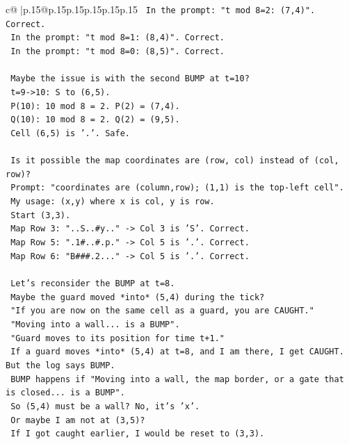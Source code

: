 \documentclass{article}
\begin{document}
{\begin{supertabular}{c@{$\;$}|p{.15\linewidth}@{}p{.15\linewidth}p{.15\linewidth}p{.15\linewidth}p{.15\linewidth}p{.15\linewidth}}
{{{\texttt{  In the prompt: "t mod 8=2: (7,4)". Correct.} \\
\texttt{  In the prompt: "t mod 8=1: (8,4)". Correct.} \\
\texttt{  In the prompt: "t mod 8=0: (8,5)". Correct.} \\
\\ 
\texttt{  Maybe the issue is with the second BUMP at t=10?} \\
\texttt{  t=9{-}>10: S to (6,5).} \\
\texttt{  P(10): 10 mod 8 = 2. P(2) = (7,4).} \\
\texttt{  Q(10): 10 mod 8 = 2. Q(2) = (9,5).} \\
\texttt{  Cell (6,5) is '.'. Safe.} \\
\\ 
\texttt{  Is it possible the map coordinates are (row, col) instead of (col, row)?} \\
\texttt{  Prompt: "coordinates are (column,row); (1,1) is the top{-}left cell".} \\
\texttt{  My usage: (x,y) where x is col, y is row.} \\
\texttt{  Start (3,3).} \\
\texttt{  Map Row 3: "..S..\#y.." {-}> Col 3 is 'S'. Correct.} \\
\texttt{  Map Row 5: ".1\#..\#.p." {-}> Col 5 is '.'. Correct.} \\
\texttt{  Map Row 6: "B\#\#\#.2..." {-}> Col 5 is '.'. Correct.} \\
\\ 
\texttt{  Let's reconsider the BUMP at t=8.} \\
\texttt{  Maybe the guard moved *into* (5,4) during the tick?} \\
\texttt{  "If you are now on the same cell as a guard, you are CAUGHT."} \\
\texttt{  "Moving into a wall... is a BUMP".} \\
\texttt{  "Guard moves to its position for time t+1."} \\
\texttt{  If a guard moves *into* (5,4) at t=8, and I am there, I get CAUGHT. But the log says BUMP.} \\
\texttt{  BUMP happens if "Moving into a wall, the map border, or a gate that is closed... is a BUMP".} \\
\texttt{  So (5,4) must be a wall? No, it's 'x'.} \\
\texttt{  Or maybe I am not at (3,5)?} \\
\texttt{  If I got caught earlier, I would be reset to (3,3).} \\
}}}
\end{supertabular}}
\end{document}
